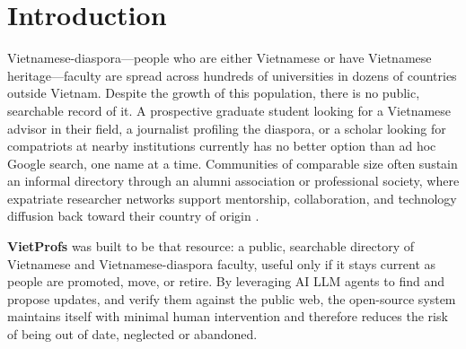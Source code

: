 \documentclass[11pt]{article}
\begin{document}
\begin{abstract}
As of 31 August 2026, the canonical snapshot contains 993 records at 423 universities in 20 countries, organized into 17 broad fields and five appointment tracks, spanning recorded PhD years from 1962 to 2026.
Runtime aggregation exposes institutional and disciplinary patterns, while Git history records additions, promotions or track corrections, moves, removals, and deduplication.
The system is not a complete census and does not provide controlled accuracy or cost estimates.
Its contribution is twofold: a public resource for a community that previously had none, and a concrete engineering pattern showing that a public directory is a continuously revalidated collection of claims about an external world, not merely a database snapshot.
\end{abstract}

\section{Introduction}
Vietnamese-diaspora---people who are either Vietnamese or have Vietnamese heritage---faculty are spread across hundreds of universities in dozens of countries outside Vietnam. Despite the growth of this population, there is no public, searchable record of it.
A prospective graduate student looking for a Vietnamese advisor in their field, a journalist profiling the diaspora, or a scholar looking for compatriots at nearby institutions currently has no better option than ad hoc Google search, one name at a time.
Communities of comparable size often sustain an informal directory through an alumni association or professional society, where expatriate researcher networks support mentorship, collaboration, and technology diffusion back toward their country of origin \cite{meyer1999scientific,kerr2008ethnic}.

\textbf{VietProfs} was built to be that resource: a public, searchable directory of Vietnamese and Vietnamese-diaspora faculty, useful only if it stays current as people are promoted, move, or retire. By leveraging AI LLM agents to find and propose updates, and verify them against the public web, the open-source system maintains itself with minimal human intervention and therefore reduces the risk of being out of date, neglected or abandoned.
\end{document}
